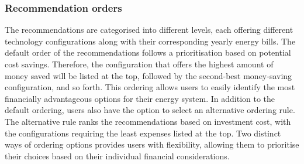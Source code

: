 \subsubsection{Recommendation orders}
The recommendations are categorised into different levels, 
each offering different technology configurations along with their corresponding yearly energy bills. 
The default order of the recommendations follows a prioritisation based on potential cost savings. 
Therefore, the configuration that offers the highest amount of money saved will be listed at the top, followed by the second-best money-saving configuration, and so forth. 
This ordering allows users to easily identify the most financially advantageous options for their energy system.
In addition to the default ordering, users also have the option to select an alternative ordering rule. 
The alternative rule ranks the recommendations based on investment cost, with the configurations requiring the least expenses listed at the top. 
Two distinct ways of ordering options provides users with flexibility, allowing them to prioritise their choices based on their individual financial considerations. 

%

